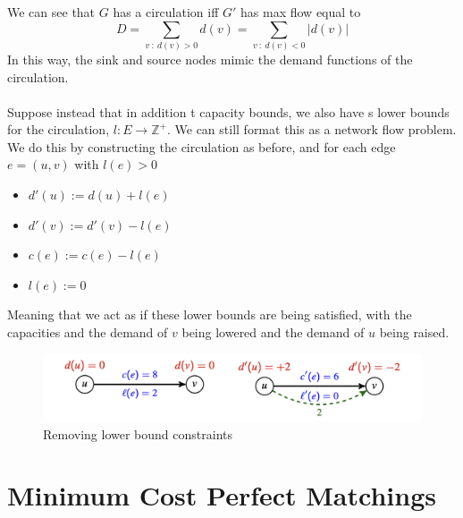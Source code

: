 \documentclass{article}
\theoremstyle{plain}
\theoremstyle{definition}
\begin{document}
        We can see that $G$ has a circulation iff $G'$ has max flow equal to 
        \[ D = \sum_{v \ : \ d(v) > 0} d(v) =  \sum_{v \ : \ d(v) < 0} |d(v)| \]
        In this way, the sink and source nodes mimic the demand functions of the circulation. \\ \\
        Suppose instead that in addition t capacity bounds, we also have s lower bounds for the circulation, $l : E \to \mathbb{Z}^+$. We can still format this as a network flow problem. We do this by constructing the circulation as before, and for each edge $e = (u,v)$ with $l(e) > 0$
        \begin{itemize}
            \item $d'(u) := d(u) + l(e)$
            \item $d'(v) := d'(v) - l(e)$
            \item $c(e) := c(e) - l(e)$
            \item $l(e) := 0$
        \end{itemize}
        Meaning that we act as if these lower bounds are being satisfied, with the capacities and the demand of $v$ being lowered and the demand of $u$ being raised. 

        \begin{figure}
            \centering
            \includegraphics[width=\linewidth]{images/lowerbound.png}
            \caption{Removing lower bound constraints}
            \label{fig:lowerbound}
        \end{figure}

\section{Minimum Cost Perfect Matchings}
\end{document}
